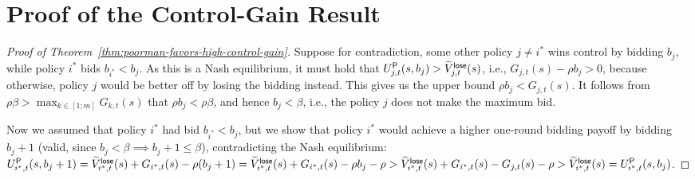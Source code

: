 \section{Proof of the \poorman Control-Gain Result}
\label{app:poorman-control-gain-proof}

\begin{proof}[Proof of Theorem~\ref{thm:poorman-favors-high-control-gain}]
	Suppose for contradiction, some other policy $j\neq i^*$ wins control by bidding $b_j$, while policy $i^*$ bids $b_{i^*}<b_j$. 
	As this is a Nash equilibrium, it must hold that 
	$U_{j,t}^{\mathsf{P}}(s,b_j) > \widetilde V^{\mathsf{lose}}_{j,t}(s)$, i.e., $G_{j,t}(s) - \rho b_j > 0$,
	because otherwise, policy $j$ would be better off by losing the bidding instead.
	This gives us the upper bound $\rho b_j < G_{j,t}(s)$.
	It follows from $\rho\beta > \max_{k\in [1;m]}G_{k,t}(s)$ that $\rho b_j < \rho\beta$, and hence $b_j<\beta$, i.e., the policy $j$ does not make the maximum bid.
	
	Now we assumed that policy $i^*$ had bid $b_{i^*}<b_j$, but we show that policy $i^*$ would achieve a higher one-round bidding payoff by bidding $b_j+1$ (valid, since $b_j<\beta\implies b_j+1\leq \beta$), contradicting the Nash equilibrium:	 
$	U_{i^*,t}^{\mathsf{P}}(s,b_j+1) 
	= \widetilde V^{\mathsf{lose}}_{i^*,t}(s)+G_{i^*,t}(s) - \rho(b_j+1) 
	= \widetilde V^{\mathsf{lose}}_{i^*,t}(s)+ G_{i^*,t}(s) - \rho b_j -\rho  
	> \widetilde V^{\mathsf{lose}}_{i^*,t}(s)+ G_{i^*,t}(s) - G_{j,t}(s) -\rho
	> \widetilde V^{\mathsf{lose}}_{i^*,t}(s) = U_{i^*,t}^{\mathsf{P}}(s,b_j)
$.
\end{proof}
